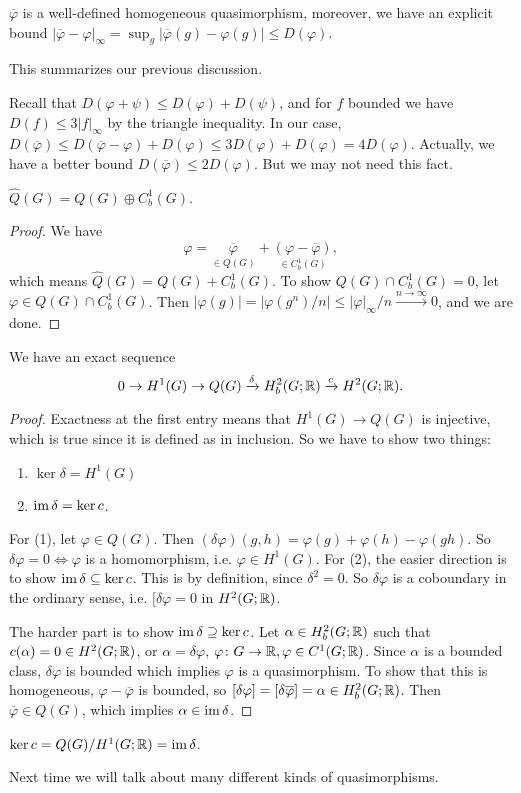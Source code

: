 \begin{lemma}
    $\overline{\varphi }$ is a well-defined homogeneous quasimorphism, moreover, we have an explicit bound $| \overline{\varphi }-\varphi |_{\infty}=\sup_g | \overline{\varphi }(g)-\varphi (g)|\leq D(\varphi )$.
\end{lemma}
This summarizes our previous discussion.
\begin{remark}
    Recall that $D(\varphi +\psi) \leq D(\varphi )+D(\psi)$, and for $f$ bounded we have $D(f) \leq 3|f|_{\infty}$ by the triangle inequality. In our case, $D(\overline{\varphi }) \leq D(\overline{\varphi }-\varphi )+D(\varphi ) \leq 3D(\varphi )+D(\varphi ) = 4D(\varphi )$. Actually, we have a better bound $D(\overline{\varphi }) \leq 2D(\varphi )$. But we may not need this fact.
\end{remark} 
\begin{prop}
    $\hat{Q}(G)=Q(G)\oplus C^1_b(G)$.
\end{prop}
\begin{proof}
    We have 
    \[
        \varphi = \underset{\in Q(G)}{\overline{\varphi }} + \underset{\in C^1_b(G)}{(\varphi -\overline{\varphi })} ,
    \] 
    which means $\hat{Q}(G)=Q(G)+C^1_b(G)$. To show $Q(G) \cap C^1_b(G)=0$, let $\varphi  \in Q(G) \cap C^1_b(G)$. Then $|\varphi (g)|= |\varphi (g^n ) / n| \leq |\varphi |_{\infty}/n \xrightarrow{n \to \infty} 0$, and we are done.
\end{proof}
\begin{prop}
    We have an exact sequence \[
        0 \to H^1(G) \to Q(G) \xrightarrow{\delta} H^2_b(G;\mathbb{R}) \xrightarrow cH^2(G;\mathbb{R}).
    \] 
\end{prop}
\begin{proof}
    Exactness at the first entry means that $H^1(G) \to Q(G)$ is injective, which is true since it is defined as in inclusion. So we have to show two things:
    \begin{enumerate}[label=(\arabic*)]
    \setlength\itemsep{-.2em}
\item $\ker \delta = H^1(G)$ 
\item $\operatorname{im} \delta = \ker c$.
    \end{enumerate}For (1), let  $\varphi  \in Q(G)$. Then $(\delta \varphi ) (g,h)= \varphi (g)+\varphi (h)-\varphi (gh)$. So $\delta\varphi =0 \iff \varphi $ is a homomorphism, i.e. $\varphi  \in H^1(G)$. For (2), the easier direction is to show $\operatorname{im} \delta \subseteq \ker c$. This is by definition, since $\delta ^2=0$. 
        So $\delta \varphi $ is a coboundary in the ordinary sense, i.e. $[\delta \varphi =0 $ in $H^2(G;\mathbb{R})$. 

        The harder part is to show $\operatorname{im} \delta \supseteq \ker c$. Let $\alpha  \in H^2_b(G;\mathbb{R})$ such that $c(\alpha )=0 \in H^2(G;\mathbb{R})$, or $\alpha =\delta \varphi $, $\varphi  \colon G \to \mathbb{R}, \varphi  \in C^1(G;\mathbb{R})$. Since $\alpha $ is a bounded class, $\delta \varphi $ is bounded which implies $\varphi $ is a quasimorphism. To show that this is homogeneous, $\varphi -\overline{\varphi }$ is bounded, so $[\delta \varphi ]=[\delta \overline{\varphi }]=\alpha  \in H^2_b(G;\mathbb{R})$. Then $\overline{\varphi }\in Q(G)$, which implies $\alpha  \in \operatorname{im} \delta$.
\end{proof}
\begin{cor}
    $\ker c = Q(G) / H^1(G;\mathbb{R})=\operatorname{im} \delta$.
\end{cor}
Next time we will talk about many different kinds of quasimorphisms.
